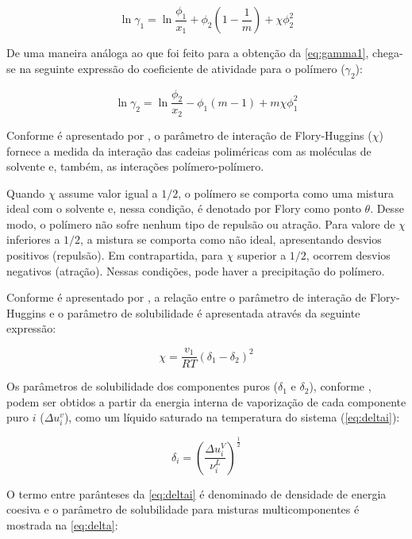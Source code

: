 \begin{equation}\label{eq:gamma1}
\ln\gamma_1 = \ln\frac{\phi_1}{x_1} + \phi_2\left( 1 - \frac{1}{m} \right) +
\chi\phi_2^2
\end{equation}

De uma maneira análoga ao que foi feito para a obtenção da \autoref{eq:gamma1},
chega-se na seguinte expressão do coeficiente de atividade para o polímero
($\gamma_2$):

\begin{equation}
\ln\gamma_2 = \ln\frac{\phi_2}{x_2} - \phi_1\left( m - 1 \right) +
m\chi\phi_1^2
\end{equation}




Conforme é apresentado por , o parâmetro de interação de
Flory-Huggins ($\chi$) fornece a medida da interação das cadeias poliméricas com as moléculas de solvente e, também, as interações
polímero-polímero. 

Quando $\chi$ assume valor igual a $1/2$, o polímero se comporta
como uma mistura ideal com o solvente e, nessa condição, é denotado por Flory
como ponto $\theta$. Desse modo, o polímero não sofre nenhum tipo de repulsão ou
atração. Para valore de $\chi$ inferiores a $1/2$, a mistura
se comporta como não ideal, apresentando desvios positivos (repulsão). 
Em contrapartida, para $\chi$ superior a $1/2$, ocorrem desvios negativos
(atração). Nessas condições, pode haver a precipitação do polímero.

Conforme é apresentado por , a relação entre o parâmetro
de interação de Flory-Huggins e o parâmetro de solubilidade é apresentada
através da seguinte expressão:

\begin{equation}
\chi = \frac{v_1}{RT}\left( \delta_1 - \delta_2 \right)^2
\end{equation}

Os parâmetros
de solubilidade dos componentes puros ($\delta_1$ e $\delta_2$), conforme
, podem ser obtidos a partir da energia interna de
vaporização de cada componente puro $i$ ($\Delta u_i^v$), como um líquido saturado na temperatura do sistema
(\autoref{eq:deltai}):

\begin{equation}\label{eq:deltai}
\delta_i = \left ( \frac{\Delta u_i^V}{\nu_i^L} \right )^{\frac{1}{2}}
\end{equation}

O termo entre parânteses da \autoref{eq:deltai} é denominado de densidade de energia
coesiva e o parâmetro de solubilidade para misturas multicomponentes é mostrada
na \autoref{eq:delta}:

